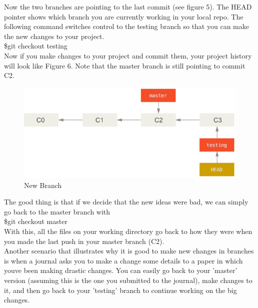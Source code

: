 \documentclass[12pt]{article}
\begin{document}
    \vspace{0.2 in}
    Now the two branches are pointing to the last commit (see figure 5). The HEAD pointer shows which branch you are currently working in your local repo.
    The following command switches control to the testing branch so that you can make the new changes to your project. \\
    \indent\indent \$git checkout testing \\
    Now if you make changes to your project and commit them, your project history will look like Figure 6. Note that the master branch is still pointing to commit C2.
    \vspace{0.2 in}
    \begin{figure}[h]
	\caption{New Branch}
	\includegraphics[scale=0.5]{figure6}
	\centering
    \end{figure} 
    \vspace{0.2 in}
    The good thing is that if we decide that the new ideas were bad, we can simply go back to the master branch with \\
    \indent\indent\$git checkout master \\
    With this, all the files on your working directory go back to how they were when you made the last push in your master branch (C2). \\
    Another scenario that illustrates why it is good to make new changes in branches is when a journal asks you to make a change some details to a paper in which you\textquotesingle ve been making drastic changes. You can easily go back to your 'master' version (assuming this is the one you submitted to the journal), make changes to it, and then go back to your 'testing' branch to continue working on the big changes.
\end{document}
